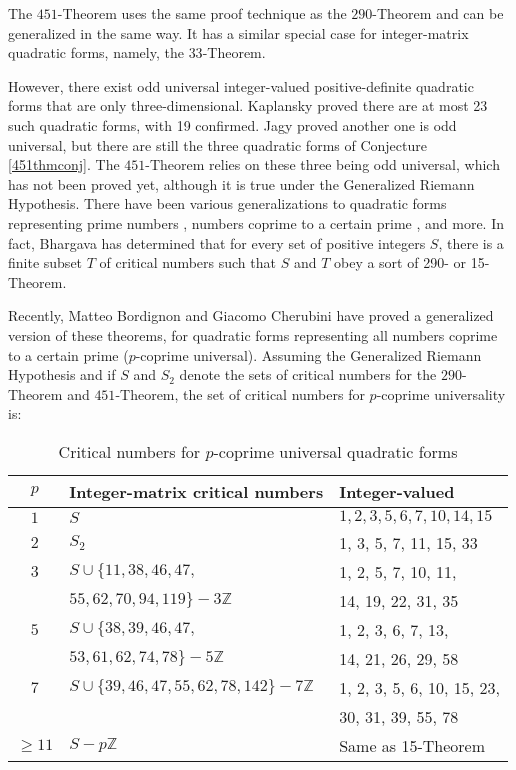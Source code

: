 \documentclass[letterpaper, 12pt]{article}
\begin{document}
The $451$-Theorem uses the same proof technique as the $290$-Theorem and can be generalized in the same way. It has a similar special case for integer-matrix quadratic forms, namely, the $33$-Theorem.

However, there exist odd universal integer-valued positive-definite quadratic forms that are only three-dimensional. Kaplansky \cite{IrvingKaplansky1995} proved there are at most 23 such quadratic forms, with 19 confirmed. Jagy \cite{Jagy1996FiveRO} proved another one is odd universal, but there are still the three quadratic forms of Conjecture \ref{451thmconj}. The $451$-Theorem relies on these three being odd universal, which has not been proved yet, although it is true under the Generalized Riemann Hypothesis. There have been various generalizations to quadratic forms representing prime numbers \cite{primeuniversaloeis}, numbers coprime to a certain prime \cite{coprimeuniv}, and more. In fact, Bhargava has determined that for every set of positive integers $S$, there is a finite subset $T$ of critical numbers such that $S$ and $T$ obey a sort of 290- or 15-Theorem.

Recently, Matteo Bordignon and Giacomo Cherubini have proved a generalized version of these theorems, for quadratic forms representing all numbers coprime to a certain prime ($p$-coprime universal). Assuming the Generalized Riemann Hypothesis and if $S$ and $S_2$ denote the sets of critical numbers for the $290$-Theorem and $451$-Theorem, the set of critical numbers for $p$-coprime universality is:
\begin{table}[H]
    \begin{tabular}{|c|l|l|} \hline
        $p$ & Integer-matrix critical numbers & Integer-valued \\ \hline
        $1$ & $S$ & $1, 2, 3, 5, 6, 7, 10, 14, 15$ \\ \hline
        $2$ & $S_2$ & 1, 3, 5, 7, 11, 15, 33 \\ \hline
        $3$ & $S \cup \{11, 38, 46, 47,$ &  1, 2, 5, 7, 10, 11, \\
        & $55, 62, 70, 94, 119\} - 3\mathbb{Z}$ & 14, 19, 22, 31, 35 \\ \hline
        $5$ & $S \cup \{38, 39, 46, 47,$ & 1, 2, 3, 6, 7, 13, \\
        & $53, 61, 62, 74, 78\} - 5\mathbb{Z}$ & 14, 21, 26, 29, 58 \\ \hline
        $7$ & $S \cup \{39, 46, 47, 55, 62, 78, 142\} - 7\mathbb{Z}$ & 1, 2, 3, 5, 6, 10, 15, 23, \\
        && 30, 31, 39, 55, 78 \\ \hline
        $\ge 11$ & $S - p\mathbb{Z}$ & Same as 15-Theorem \\ \hline
    \end{tabular}
    \caption{Critical numbers for $p$-coprime universal quadratic forms}
    \label{coprimeunivtable}
\end{table}
\end{document}
